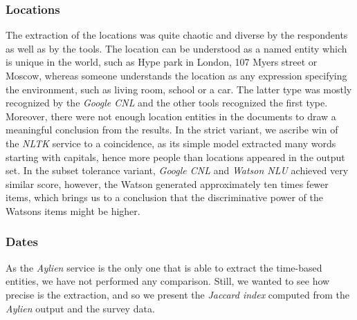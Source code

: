 \documentclass[
  digital, %
  table,   %
  lof,     %
  lot,     %
]{fithesis3}
\begin{document}
\subsubsection{\textbf{Locations}}
The extraction of the locations was quite chaotic and diverse by the respondents as well as by the tools.
The location can be understood as a named entity which is unique in the world, such as Hype park in London, 107 Myers street or Moscow, whereas someone understands the location as any expression specifying the environment, such as living room, school or a car.
The latter type was mostly recognized by the \textit{Google CNL} and the other tools recognized the first type.
Moreover, there were not enough location entities in the documents to draw a meaningful conclusion from the results.
In the strict variant, we ascribe win of the \textit{NLTK} service to a coincidence, as its simple model extracted many words starting with capitals, hence more people than locations appeared in the output set.
In the subset tolerance variant, \textit{Google CNL} and \textit{Watson NLU} achieved very similar score, however, the Watson generated approximately ten times fewer items, which brings us to a conclusion that the discriminative power of the Watsons items might be higher.

\subsubsection{\textbf{Dates}}
As the \textit{Aylien} service is the only one that is able to extract the time-based entities, we have not performed any comparison.
Still, we wanted to see how precise is the extraction, and so we present the \textit{Jaccard index} computed from the \textit{Aylien} output and the survey data.
\end{document}
